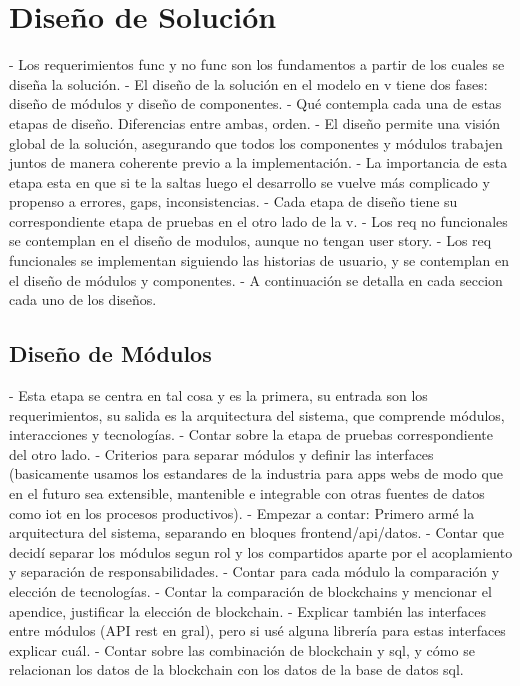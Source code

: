 \chapter[Diseño de Solución]{Diseño de Solución}
\label{cp:design}

\parindent0pt

- Los requerimientos func y no func son los fundamentos a partir de los cuales se diseña la solución.
- El diseño de la solución en el modelo en v tiene dos fases: diseño de módulos y diseño de componentes.
- Qué contempla cada una de estas etapas de diseño. Diferencias entre ambas, orden.
- El diseño permite una visión global de la solución, asegurando que todos los componentes y módulos trabajen juntos de manera coherente previo a la implementación. 
- La importancia de esta etapa esta en que si te la saltas luego el desarrollo se vuelve más complicado y propenso a errores, gaps, inconsistencias.
- Cada etapa de diseño tiene su correspondiente etapa de pruebas en el otro lado de la v.
- Los req no funcionales se contemplan en el diseño de modulos, aunque no tengan user story.
- Los req funcionales se implementan siguiendo las historias de usuario, y se contemplan en el diseño de módulos y componentes.
- A continuación se detalla en cada seccion cada uno de los diseños.

\section{Diseño de Módulos}
\label{sec:module-design}

- Esta etapa se centra en tal cosa y es la primera, su entrada son los requerimientos, su salida es la arquitectura del sistema, que comprende módulos, interacciones y tecnologías.
- Contar sobre la etapa de pruebas correspondiente del otro lado.
- Criterios para separar módulos y definir las interfaces (basicamente usamos los estandares de la industria para apps webs de modo que en el futuro sea extensible, mantenible e integrable con otras fuentes de datos como iot en los procesos productivos).
- Empezar a contar: Primero armé la arquitectura del sistema, separando en bloques frontend/api/datos. 
- Contar que decidí separar los módulos segun rol y los compartidos aparte por el acoplamiento y separación de responsabilidades.
- Contar para cada módulo la comparación y elección de tecnologías. 
- Contar la comparación de blockchains y mencionar el apendice, justificar la elección de blockchain.
- Explicar también las interfaces entre módulos (API rest en gral), pero si usé alguna librería para estas interfaces explicar cuál.
- Contar sobre las combinación de blockchain y sql, y cómo se relacionan los datos de la blockchain con los datos de la base de datos sql.

